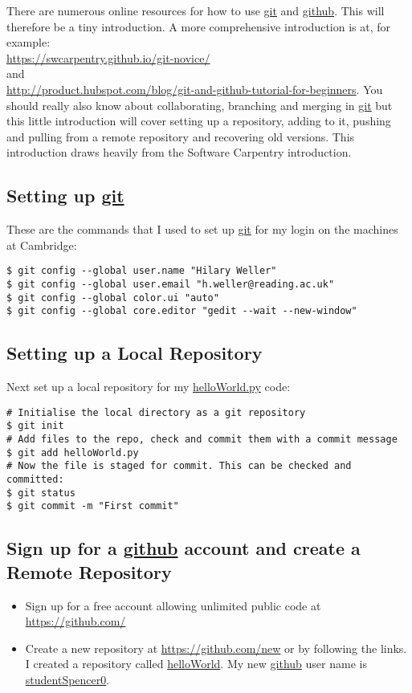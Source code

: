 \pause There are numerous online resources for how to use \url{git}
and \url{github}. This will therefore be a tiny introduction. A more
comprehensive introduction is at, for example:\\
\url{https://swcarpentry.github.io/git-novice/}\\
and\\
\url{http://product.hubspot.com/blog/git-and-github-tutorial-for-beginners}.
You should really also know about collaborating, branching and merging
in \url{git} but this little introduction will cover setting up a
repository, adding to it, pushing and pulling from a remote repository
and recovering old versions. This introduction draws heavily from
the Software Carpentry introduction. \pause 


\subsection{Setting up \protect\url{git}}

These are the commands that I used to set up \url{git} for my login
on the machines at Cambridge:

\begin{lstlisting}
$ git config --global user.name "Hilary Weller"
$ git config --global user.email "h.weller@reading.ac.uk"
$ git config --global color.ui "auto"
$ git config --global core.editor "gedit --wait --new-window"
\end{lstlisting}


\clearpage{}


\subsection{Setting up a Local Repository}

Next set up a local repository for my \url{helloWorld.py} code:

\begin{lstlisting}
# Initialise the local directory as a git repository
$ git init
# Add files to the repo, check and commit them with a commit message
$ git add helloWorld.py
# Now the file is staged for commit. This can be checked and committed:
$ git status
$ git commit -m "First commit"
\end{lstlisting}
\pause 


\subsection{Sign up for a \protect\url{github} account and create a Remote Repository}
\begin{itemize}
\item Sign up for a free account allowing unlimited public code at \url{https://github.com/}
\item Create a new repository at \url{https://github.com/new} or by following
the links. I created a repository called \url{helloWorld}. My new
\url{github} user name is \url{studentSpencer0}. 
\end{itemize}
\pause 


